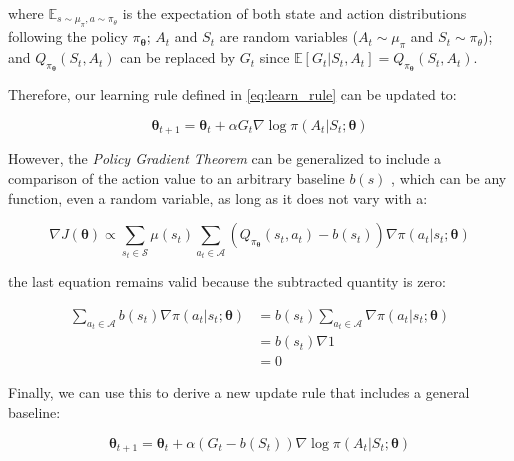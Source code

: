 \documentclass[twoside,twocolumn]{article}
\begin{document}
\noindent where $\mathbb{E}_{s \sim \mu_{\pi}, a \sim \pi_{\theta}}$ is the expectation of both state and action distributions following the policy $\pi_{\boldsymbol{\theta}}$; $A_t$ and $S_t$ are random variables ($A_t \sim \mu_{\pi}$ and $S_t \sim \pi_{\theta}$); and $Q_{\pi_{\boldsymbol{\theta}}}(S_t,A_t)$ can be replaced by $G_t$ since $\mathbb{E}[G_t| S_t,A_t] = Q_{\pi_{\boldsymbol{\theta}}}(S_t,A_t)$.

Therefore, our learning rule defined in \ref{eq:learn_rule} can be updated to:

\begin{equation*}
  \boldsymbol{\theta}_{t+1} = \boldsymbol{\theta}_{t} + \alpha G_t \nabla \log{\pi (A_t|S_t; \boldsymbol{\theta})}
\end{equation*}

However, the \emph{Policy Gradient Theorem} can be generalized to include a comparison of the action value to an arbitrary baseline $b(s)$ \cite{Sutton1998}, which can be any function, even a random variable, as long as it does not vary with a:

\begin{equation*}
  \nabla J({\boldsymbol{\theta}}) \propto
  \sum_{s_t \in \mathcal{S}} \mu (s_t) \sum_{a_t \in \mathcal{A}} \left( Q_{\pi_{\boldsymbol{\theta}}}(s_t,a_t) - b(s_t) \right) \nabla \pi (a_t|s_t; \boldsymbol{\theta})
\end{equation*}

the last equation remains valid because the subtracted quantity is zero:

\begin{equation*}
  \begin{split}
    \sum_{a_t \in \mathcal{A}} b(s_t) \nabla \pi (a_t|s_t; \boldsymbol{\theta}) &=
    b(s_t) \sum_{a_t \in \mathcal{A}} \nabla \pi (a_t|s_t; \boldsymbol{\theta})\\
    &= b(s_t) \nabla 1 \\
    &= 0
  \end{split}
\end{equation*}

Finally, we can use this to derive a new update rule that includes a general baseline:

\begin{equation}
  \boldsymbol{\theta}_{t+1} = \boldsymbol{\theta}_{t} + \alpha (G_t - b(S_t)) \nabla \log{\pi (A_t|S_t; \boldsymbol{\theta})}
  \label{eq:learn_rule_bl}
\end{equation}

\end{document}
